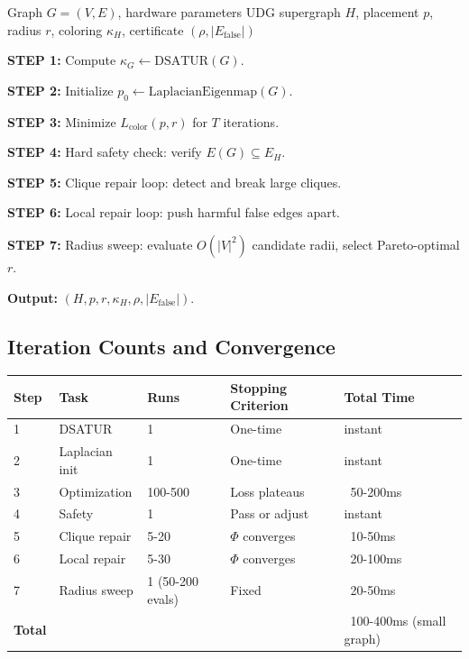 \documentclass[11pt]{article}
\newcommand{\Efalse}{E_{\mathrm{false}}}
\begin{document}
\begin{algorithm}[H]
\caption{Safe Near-UDG Compiler for Graph Coloring}
\begin{algorithmic}[1]
\Require Graph $G=(V,E)$, hardware parameters
\Ensure UDG supergraph $H$, placement $p$, radius $r$, coloring $\kappa_H$, certificate $(\rho, |\Efalse|)$

\State \textbf{STEP 1:} Compute $\kappa_G \leftarrow \mathrm{DSATUR}(G)$.

\State \textbf{STEP 2:} Initialize $p_0 \leftarrow \mathrm{LaplacianEigenmap}(G)$.

\State \textbf{STEP 3:} Minimize $L_{\mathrm{color}}(p,r)$ for $T$ iterations.

\State \textbf{STEP 4:} Hard safety check: verify $E(G) \subseteq E_H$.

\State \textbf{STEP 5:} Clique repair loop: detect and break large cliques.

\State \textbf{STEP 6:} Local repair loop: push harmful false edges apart.

\State \textbf{STEP 7:} Radius sweep: evaluate $O(|V|^2)$ candidate radii,
       select Pareto-optimal $r$.

\State \textbf{Output:} $(H, p, r, \kappa_H, \rho, |\Efalse|)$.
\end{algorithmic}
\end{algorithm}

\subsection{Iteration Counts and Convergence}

\begin{center}
\begin{tabular}{@{}lllll@{}}
\toprule
Step & Task & Runs & Stopping Criterion & Total Time \\
\midrule
1 & DSATUR & 1 & One-time & instant \\
2 & Laplacian init & 1 & One-time & instant \\
3 & Optimization & 100-500 & Loss plateaus & ~50-200ms \\
4 & Safety & 1 & Pass or adjust & instant \\
5 & Clique repair & 5-20 & $\Phi$ converges & ~10-50ms \\
6 & Local repair & 5-30 & $\Phi$ converges & ~20-100ms \\
7 & Radius sweep & 1 (50-200 evals) & Fixed & ~20-50ms \\
\toprule
\textbf{Total} & & & & ~100-400ms (small graph) \\
\bottomrule
\end{tabular}
\end{center}
\end{document}
